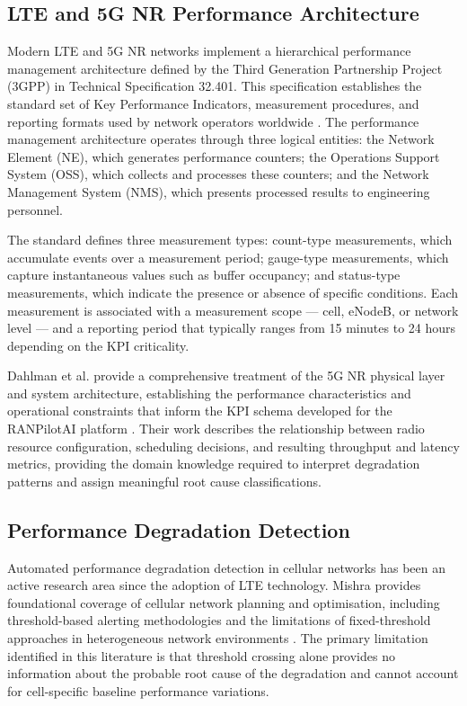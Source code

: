 \subsection{LTE and 5G NR Performance Architecture}

Modern LTE and 5G NR networks implement a hierarchical performance management architecture defined by the Third Generation Partnership Project (3GPP) in Technical Specification 32.401. This specification establishes the standard set of Key Performance Indicators, measurement procedures, and reporting formats used by network operators worldwide \cite{sesia2011}. The performance management architecture operates through three logical entities: the Network Element (NE), which generates performance counters; the Operations Support System (OSS), which collects and processes these counters; and the Network Management System (NMS), which presents processed results to engineering personnel.

The standard defines three measurement types: count-type measurements, which accumulate events over a measurement period; gauge-type measurements, which capture instantaneous values such as buffer occupancy; and status-type measurements, which indicate the presence or absence of specific conditions. Each measurement is associated with a measurement scope — cell, eNodeB, or network level — and a reporting period that typically ranges from 15 minutes to 24 hours depending on the KPI criticality.

Dahlman et al. provide a comprehensive treatment of the 5G NR physical layer and system architecture, establishing the performance characteristics and operational constraints that inform the KPI schema developed for the RANPilotAI platform \cite{dahlman2020}. Their work describes the relationship between radio resource configuration, scheduling decisions, and resulting throughput and latency metrics, providing the domain knowledge required to interpret degradation patterns and assign meaningful root cause classifications.

\subsection{Performance Degradation Detection}

Automated performance degradation detection in cellular networks has been an active research area since the adoption of LTE technology. Mishra provides foundational coverage of cellular network planning and optimisation, including threshold-based alerting methodologies and the limitations of fixed-threshold approaches in heterogeneous network environments \cite{mishra2007}. The primary limitation identified in this literature is that threshold crossing alone provides no information about the probable root cause of the degradation and cannot account for cell-specific baseline performance variations.

